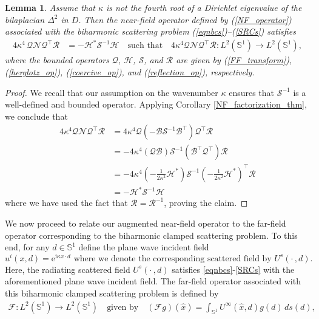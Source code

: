 \documentclass{article}
\newtheorem{Lemma}[Theorem]{Lemma}
\begin{document}
\begin{Lemma}\label{Factorization_analysis}
Assume that $\kappa$ is not the fourth root of a Dirichlet eigenvalue of the bilaplacian $\Delta^2$ in $D$. Then the near-field operator defined by (\ref{NF_operator}) associated with the biharmonic scattering problem (\ref{eqnbcs})--(\ref{SRCs}) satisfies
\begin{align}\label{NF_fixed_factorization}
4\kappa^4\,\mathcal Q\mathcal N\mathcal Q^\top\mathcal R
&=
-\mathcal H^{*}\mathcal S^{-1}\mathcal H\quad \text{such that}\quad 4\kappa^4\mathcal Q\mathcal N\mathcal Q^\top\mathcal R: L^2(\mathbb S^1)\to L^2(\mathbb S^1),
\end{align}
where the bounded operators $\mathcal Q$, $\mathcal H$, $\mathcal S$, and $\mathcal R$ are given by (\ref{FF_transform}), (\ref{herglotz_op}), (\ref{coercive_op}), and (\ref{reflection_op}), respectively. 
\end{Lemma}
\begin{proof}
We recall that our assumption on the wavenumber $\kappa$ ensures that $\mathcal S^{-1}$ is a well-defined and bounded operator. Applying Corollary \ref{NF_factorization_thm}, we conclude that
\begin{align*}
4\kappa^4\mathcal Q\mathcal N\mathcal Q^\top \mathcal R&=4\kappa^4\mathcal Q(-\mathcal B\mathcal S^{-1}\mathcal B^\top)\mathcal Q^\top \mathcal R\\
&=-4\kappa^4(\mathcal Q\mathcal B)\mathcal S^{-1}(\mathcal B^\top \mathcal Q^\top)\mathcal R\\
&=-4\kappa^4\left(-\frac{1}{2\kappa^2}\mathcal H^{*}\right)\mathcal S^{-1}\left(-\frac{1}{2\kappa^2}\mathcal H^{*}\right)^\top\mathcal R\\
&=-\mathcal{H}^{*}\mathcal S^{-1}\mathcal H
\end{align*}
where we have used the fact that $\mathcal{R}=\mathcal{R}^{-1}$, proving the claim.
\end{proof}
We now proceed to relate our augmented near-field operator to the far-field operator corresponding to the biharmonic clamped scattering problem. To this end, for any $d \in \mathbb{S}^1$ define the plane wave incident field
\[
u^i(x,d)=\mathrm e^{\mathrm i\kappa x\cdot d} \,\,\text{where we denote the corresponding scattered field by } U^{s}(\cdot \, , d). 
\]
Here, the radiating scattered field $U^{s}(\cdot \, , d)$ satisfies \eqref{eqnbcs}-\eqref{SRCs} with the aforementioned plane wave incident field. The far-field operator associated with this biharmonic clamped scattering
problem is defined by
\begin{align}\label{FF_operator}
\mathcal F:L^2(\mathbb S^1)\to L^2(\mathbb S^1)
\quad \text{given by}\quad
(\mathcal Fg)(\hat x)
=
\int_{\mathbb S^1}
U^\infty(\hat x,d)g(d)\,ds(d),
\end{align}
\end{document}
